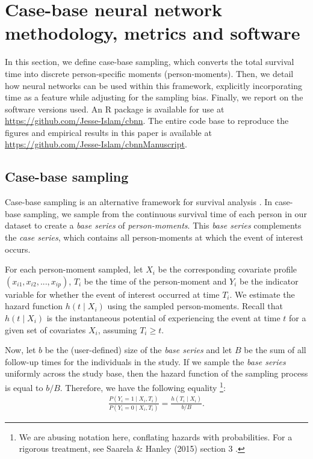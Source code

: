 \documentclass[AMA,STIX1COL,]{WileyNJD-v2}
\begin{document}
\hypertarget{methods}{%
\section{Case-base neural network methodology, metrics and
software}\label{methods}}

In this section, we define case-base sampling, which converts the total
survival time into discrete person-specific moments (person-moments).
Then, we detail how neural networks can be used within this framework,
explicitly incorporating time as a feature while adjusting for the
sampling bias. Finally, we report on the software versions used. An R
package is available for use at
\url{https://github.com/Jesse-Islam/cbnn}. The entire code base to
reproduce the figures and empirical results in this paper is available
at \url{https://github.com/Jesse-Islam/cbnnManuscript}.

\hypertarget{case-base-sampling}{%
\subsection{Case-base sampling}\label{case-base-sampling}}

Case-base sampling is an alternative framework for survival analysis
\citep{hanley2009}. In case-base sampling, we sample from the continuous
survival time of each person in our dataset to create a \emph{base
series} of \emph{person-moments}. This \emph{base series} complements
the \emph{case series}, which contains all person-moments at which the
event of interest occurs.

For each person-moment sampled, let \(X_i\) be the corresponding
covariate profile \(\left(x_{i1},x_{i2},...,x_{ip} \right)\), \(T_i\) be
the time of the person-moment and \(Y_i\) be the indicator variable for
whether the event of interest occurred at time \(T_i\). We estimate the
hazard function \(h(t \mid X_i)\) using the sampled person-moments.
Recall that \(h(t \mid X_i)\) is the instantaneous potential of
experiencing the event at time \(t\) for a given set of covariates
\(X_i\), assuming \(T_i \geq t\).

Now, let \(b\) be the (user-defined) size of the \emph{base series} and
let \(B\) be the sum of all follow-up times for the individuals in the
study. If we sample the \emph{base series} uniformly across the study
base, then the hazard function of the sampling process is equal to
\(b/B\). Therefore, we have the following equality
\footnote{We are abusing notation here, conflating hazards with probabilities. For a rigorous treatment, see Saarela \& Hanley (2015) section 3 \cite{saarela2015}.}:
\begin{align}\label{eqn:main}
\frac{P\left(Y_i=1 \mid X_i, T_i\right)}{P\left(Y_i = 0 \mid X_i, T_i\right)} = \frac{h\left(T_i \mid X_i\right)}{b/B}.
\end{align}
\end{document}

